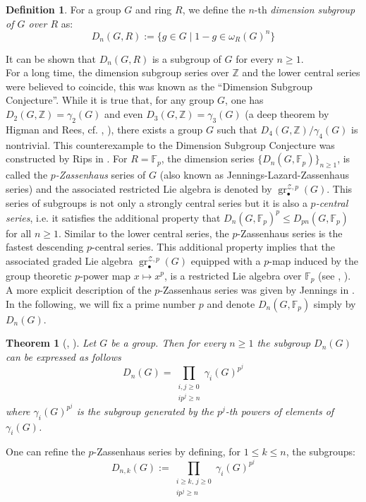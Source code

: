 \documentclass{amsart}
\theoremstyle{plain}
\newtheorem{theorem}{Theorem}
\theoremstyle{definition}
\newtheorem{defn}{Definition}
\numberwithin{theorem}{section}
\numberwithin{equation}{section}
\newcommand{\grZ}{\operatorname{gr}^{{\mathcal Z}, p}}
\newcommand{\FF}{\mathbb{F}}
\newcommand{\Z}{\mathbb Z}
\begin{document}
\begin{defn}
    For a group $G$ and ring $R$, we define the $n$-th \emph{dimension subgroup of $G$ over $R$} as:
    \[
        D_n(G, R) := \{g \in G \mid 1-g \in \omega_R(G)^n\}
    \]
\end{defn}
\noindent
It can be shown that $D_n(G, R)$ is a subgroup of $G$ for every $n \geq 1$. \\
For a long time, the dimension subgroup series over $\Z$ and the lower central series were believed to coincide, this was known as the ``Dimension Subgroup Conjecture''. While it is true that, for any group $G$, one has $D_2(G, \Z) = \gamma_2(G)$ and even $D_3(G, \Z) = \gamma_3(G)$ (a deep theorem by Higman and Rees, cf. \cite{Pas79}, \cite{Gup90}), there exists a group $G$ such that $D_4(G, \Z)/\gamma_4(G)$ is nontrivial. This counterexample to the Dimension Subgroup Conjecture was constructed by Rips in \cite{Rip72}.
\medskip
For $R = \FF_p$, the dimension series $\{D_n(G, \FF_p)\}_{n \geq 1}$, is called the \emph{$p$-Zassenhaus} series of $G$ (also known as Jennings-Lazard-Zassenhaus series) and the associated restricted Lie algebra is denoted by $\grZ_\bullet(G)$. This series of subgroups is not only a strongly central series but it is also a \emph{$p$-central series}, i.e. it satisfies the additional property that $D_n(G, \FF_p)^p \leq D_{pn}(G, \FF_p)$ for all $n \geq 1$. Similar to the lower central series, the $p$-Zassenhaus series is the fastest descending $p$-central series.  
This additional property implies that the associated graded Lie algebra $\grZ_\bullet(G)$ equipped with a $p$-map induced by the group theoretic $p$-power map $x \mapsto x^p$, is a restricted Lie algebra over $\mathbb F_p$  (see \cite{Zas39}, \cite{Laz54}).
\medskip\\
A more explicit description of the $p$-Zassenhaus series was given by Jennings in \cite{Jen41}. In the following, we will fix a prime number $p$ and denote $D_n(G, \FF_p)$ simply by $D_n(G)$. 
\begin{theorem}[\cite{Jen41}, \cite{Laz54}]\label{th:jennings}
    Let $G$ be a group. Then for every $n \geq 1$ the subgroup $D_n(G)$ can be expressed as follows
    \begin{equation}\label{eq:dimension.jennings}
        D_n(G) = \prod_{\substack{i, j \geq 0 \\ ip^j \geq n}} \gamma_i(G)^{p^j}
    \end{equation}
    where $\gamma_i(G)^{p^j}$ is the subgroup generated by the $p^j$-th powers of elements of $\gamma_i(G)$.
\end{theorem}
One can refine the $p$-Zassenhaus series by defining, for $1 \leq k \leq n$, the subgroups:
\begin{equation}\label{eq:dimension.jennings.refined}
    D_{n, k}(G) := \prod_{\substack{i \geq k,\, j \geq 0 \\ ip^j \geq n}} \gamma_i(G)^{p^j}
\end{equation}
\end{document}
